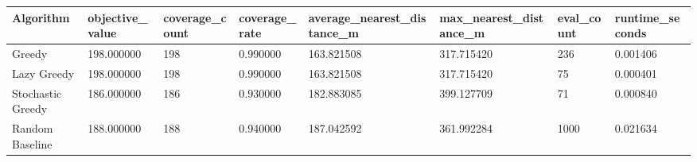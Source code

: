 \begin{tabular}{llllllll}
\hline
Algorithm & objective_value & coverage_count & coverage_rate & average_nearest_distance_m & max_nearest_distance_m & eval_count & runtime_seconds \\
\hline
Greedy & 198.000000 & 198 & 0.990000 & 163.821508 & 317.715420 & 236 & 0.001406 \\
Lazy Greedy & 198.000000 & 198 & 0.990000 & 163.821508 & 317.715420 & 75 & 0.000401 \\
Stochastic Greedy & 186.000000 & 186 & 0.930000 & 182.883085 & 399.127709 & 71 & 0.000840 \\
Random Baseline & 188.000000 & 188 & 0.940000 & 187.042592 & 361.992284 & 1000 & 0.021634 \\
\hline
\end{tabular}
